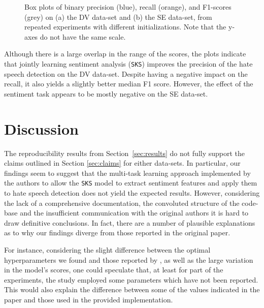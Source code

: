 \begin{figure}
%
  \caption{\label{fig:pr}Box plots of binary
    precision (blue), recall (orange), and F1-scores (grey) on (a) the DV data-set and
    (b) the SE data-set, from repeated experiments
    with different initializations.
    Note that the y-axes do not have the same scale.
  }
\end{figure}

Although there is a large overlap in the range of the scores,
the plots indicate that
jointly learning sentiment analysis (\texttt{SKS}) improves
the precision of the hate speech detection on the DV data-set.
Despite having a negative impact on the recall,
it also yields a slightly better median F1 score. However, the effect of the sentiment task appears to be mostly negative on the SE data-set.


\section{Discussion}

The reproducibility results from Section~\ref{sec:results} do not fully support the claims outlined in Section \ref{sec:claims} for either data-sets. In particular, our findings seem to suggest that the multi-task learning approach implemented by the authors to allow the \texttt{SKS} model to extract sentiment features and apply them to hate speech detection does not yield the expected results. However, considering the lack of a comprehensive documentation, the convoluted structure of the code-base and the insufficient communication with the original authors it is hard to draw definitive conclusions. In fact, there are a number of plausible explanations as to why our findings diverge from those reported in the original paper.

For instance, considering the slight difference between the optimal hyperparameters we found and those reported by \citeauthor{original:zhou}, as well as the large variation in the model's scores, one could speculate that, at least for part of the experiments, the study employed some parameters which have not been reported. This would also explain the difference between some of the values indicated in the paper and those used in the provided implementation.

